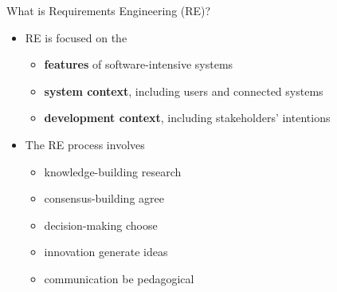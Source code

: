 

\begin{Slide}{What is Requirements Engineering (RE)?}

\begin{itemize}
\item RE is focused on the
\begin{itemize}
\item \textbf{features} of software-intensive systems 
\item \textbf{system context}, including users and connected systems
\item \textbf{development context}, including stakeholders' intentions 

\end{itemize}
\item The RE process involves 
\begin{itemize}
\item knowledge-building \hfill research
\item consensus-building \hfill agree
\item decision-making    \hfill choose
\item innovation         \hfill generate ideas
\item communication      \hfill be pedagogical

\end{itemize}
\end{itemize}
\end{Slide}